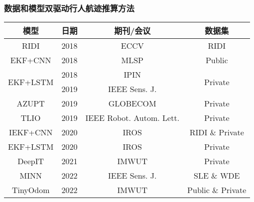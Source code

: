 \begin{frame}
	\frametitle{数据和模型双驱动行人航迹推算方法}	
	{\footnotesize
		\begin{tabular*}{\linewidth}{@{\extracolsep{\fill}}cccc}
			\toprule
			\multicolumn{1}{c}{模型} & 日期 & 期刊/会议 & 数据集 \\
			\midrule
			                     RIDI & 2018 & ECCV                            & RIDI                     \\ %
			                  EKF+CNN & 2018 & MLSP                            & Public                     \\ %
			\multirow{2}{*}{EKF+LSTM} & 2018 & IPIN                            & \multirow{2}{*}{Private} \\ %
			                          & 2019 & IEEE Sens. J.                   &                          \\ %
			                    AZUPT & 2019 & GLOBECOM                        & Private                  \\ %
			                     TLIO & 2019 & IEEE Robot. Autom. Lett.        & Private                  \\ %
			                 IEKF+CNN & 2020 & IROS                            & RIDI \& Private          \\ %
			                 EKF+LSTM & 2020 & IROS                            & Private                  \\ %
			                   DeepIT & 2021 & IMWUT                           & Private                  \\ %
			                     MINN & 2022 & IEEE Sens. J.                   & SLE \& WDE         \\ %
			                 TinyOdom & 2022 & IMWUT                           & Public \& Private         \\ %

\end{tabular*}}
\end{frame}
